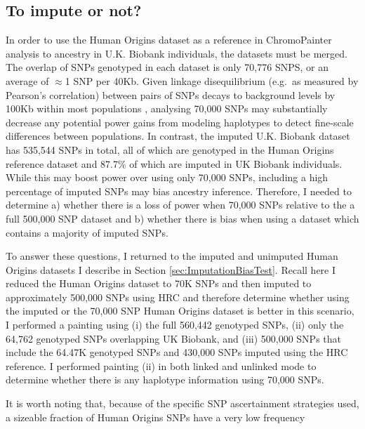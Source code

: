 \subsection{To impute or not?}

In order to use the Human Origins dataset as a reference in ChromoPainter analysis to ancestry in U.K. Biobank individuals, the datasets must be merged. The overlap of SNPs genotyped in each dataset is only 70,776 SNPS, or an average of $\approx$1 SNP per 40Kb. Given linkage disequilibrium (e.g.\ as measured by Pearson's correlation) between pairs of SNPs decays to background levels by 100Kb within most populations \cite{bosch2009decay}, analysing 70,000 SNPs may substantially decrease any potential power gains from modeling haplotypes to detect fine-scale differences between populations. In contrast, the imputed U.K. Biobank dataset has 535,544 SNPs in total, all of which are genotyped in the Human Origins reference dataset and 87.7\% of which are imputed in UK Biobank individuals. While this may boost power over using only 70,000 SNPs, including a high percentage of imputed SNPs may bias ancestry inference. Therefore, I needed to determine a) whether there is a loss of power when 70,000 SNPs relative to the a full 500,000 SNP dataset and b) whether there is bias when using a dataset which contains a majority of imputed SNPs.  

To answer these questions, I returned to the imputed and unimputed Human Origins datasets I describe in Section \ref{sec:ImputationBiasTest}. Recall here I reduced the Human Origins dataset to 70K SNPs and then imputed to approximately 500,000 SNPs using HRC and therefore determine whether using the imputed or the 70,000 SNP Human Origins dataset is better in this scenario, I performed a painting using (i) the full 560,442 genotyped SNPs, (ii) only the 64,762 genotyped SNPs overlapping UK Biobank, and (iii) 500,000 SNPs that include the 64.47K genotyped SNPs and 430,000 SNPs imputed using the HRC reference. I performed painting (ii) in both linked and unlinked mode to determine whether there is any haplotype information using 70,000 SNPs.

It is worth noting that, because of the specific SNP ascertainment strategies used, a sizeable fraction of Human Origins SNPs have a very low frequency

